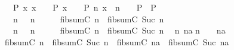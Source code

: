\begin{isabellebody}
\begin{isamarkuptxt}
  \begin{isabelle}%
\ {}{\isachardot}\ {\isasymAnd}P\ x{\isachardot}\ {\isasymlbrakk}x\ {\isacharequal}\ {}\ {\isasymLongrightarrow}\ P{\isacharsemicolon}\ x\ {\isacharequal}\ {}\ {\isasymLongrightarrow}\ P{\isacharsemicolon}\ {\isasymAnd}n{\isachardot}\ x\ {\isacharequal}\ n\ {\isacharplus}\ {}\ {\isasymLongrightarrow}\ P{\isasymrbrakk}\ {\isasymLongrightarrow}\ P\isanewline
\ {}{\isachardot}\ {}\ {\isacharequal}\ {}\ {\isasymLongrightarrow}\ {}\ {\isacharequal}\ {}\isanewline
\ {}{\isachardot}\ {}\ {\isacharequal}\ {}\ {\isasymLongrightarrow}\ {}\ {\isacharequal}\ {}\isanewline
\ {}{\isachardot}\ {\isasymAnd}n{\isachardot}\ {}\ {\isacharequal}\ n\ {\isacharplus}\ {}\ {\isasymLongrightarrow}\ {}\ {\isacharequal}\ fib{}{\isacharunderscore}sumC\ n\ {\isacharplus}\ fib{}{\isacharunderscore}sumC\ {\isacharparenleft}Suc\ n{\isacharparenright}\isanewline
\ {}{\isachardot}\ {}\ {\isacharequal}\ {}\ {\isasymLongrightarrow}\ {}\ {\isacharequal}\ {}\isanewline
\ {}{\isachardot}\ {\isasymAnd}n{\isachardot}\ {}\ {\isacharequal}\ n\ {\isacharplus}\ {}\ {\isasymLongrightarrow}\ {}\ {\isacharequal}\ fib{}{\isacharunderscore}sumC\ n\ {\isacharplus}\ fib{}{\isacharunderscore}sumC\ {\isacharparenleft}Suc\ n{\isacharparenright}\isanewline
\ {}{\isachardot}\ {\isasymAnd}n\ na{\isachardot}\isanewline
{}n\ {\isacharplus}\ {}\ {\isacharequal}\ na\ {\isacharplus}\ {}\ {\isasymLongrightarrow}\isanewline
{}fib{}{\isacharunderscore}sumC\ n\ {\isacharplus}\ fib{}{\isacharunderscore}sumC\ {\isacharparenleft}Suc\ n{\isacharparenright}\ {\isacharequal}\ fib{}{\isacharunderscore}sumC\ na\ {\isacharplus}\ fib{}{\isacharunderscore}sumC\ {\isacharparenleft}Suc\ na{\isacharparenright}%
\end{isabelle}


\end{isamarkuptxt}
\end{isabellebody}
